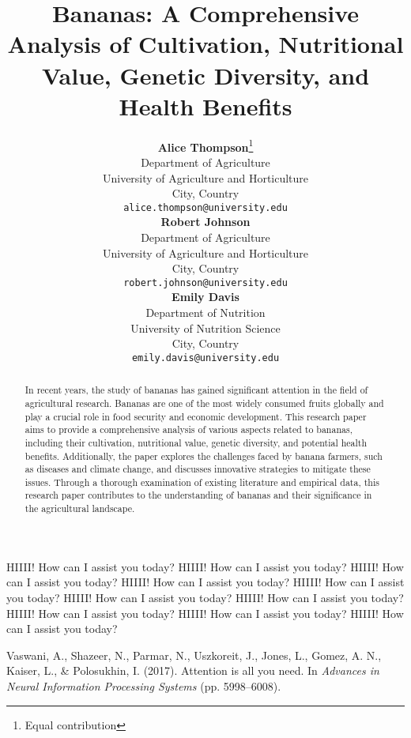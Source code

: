 \documentclass{article}
\title{Bananas: A Comprehensive Analysis of Cultivation, Nutritional Value, Genetic Diversity, and Health Benefits}
\author{
  \textbf{Alice Thompson}\thanks{Equal contribution} \\
  Department of Agriculture\\
  University of Agriculture and Horticulture\\
  City, Country \\
  \texttt{alice.thompson@university.edu} \\
  \And
  \textbf{Robert Johnson}\footnotemark[1] \\
  Department of Agriculture\\
  University of Agriculture and Horticulture\\
  City, Country \\
  \texttt{robert.johnson@university.edu} \\
  \And
  \textbf{Emily Davis} \\
  Department of Nutrition\\
  University of Nutrition Science\\
  City, Country \\
  \texttt{emily.davis@university.edu} \\
}
\begin{document}
\maketitle

\begin{abstract}
In recent years, the study of bananas has gained significant attention in the field of agricultural research. Bananas are one of the most widely consumed fruits globally and play a crucial role in food security and economic development. This research paper aims to provide a comprehensive analysis of various aspects related to bananas, including their cultivation, nutritional value, genetic diversity, and potential health benefits. Additionally, the paper explores the challenges faced by banana farmers, such as diseases and climate change, and discusses innovative strategies to mitigate these issues. Through a thorough examination of existing literature and empirical data, this research paper contributes to the understanding of bananas and their significance in the agricultural landscape.
\end{abstract}

HIIII! How can I assist you today?
HIIII! How can I assist you today?
HIIII! How can I assist you today?
HIIII! How can I assist you today?
HIIII! How can I assist you today?
HIIII! How can I assist you today?
HIIII! How can I assist you today?
HIIII! How can I assist you today?
HIIII! How can I assist you today?
HIIII! How can I assist you today?


\begin{thebibliography}{10}

Vaswani, A., Shazeer, N., Parmar, N., Uszkoreit, J., Jones, L., Gomez, A. N., Kaiser, L., \& Polosukhin, I. (2017).
Attention is all you need.
In \textit{Advances in Neural Information Processing Systems} (pp. 5998--6008).

\end{thebibliography}
\end{document}
